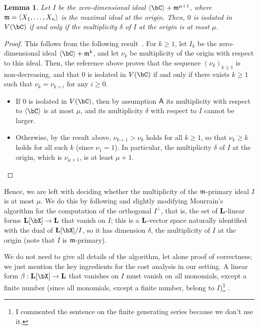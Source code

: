 \documentclass[12pt]{article}
\newtheorem{lemma}[definition]{Lemma}
\begin{document}
\begin{lemma}
  Let $I$ be the zero-dimensional ideal
  $\langle \bC \rangle + \m^{\mu+1}$, where
  $\mathfrak{m}=\langle X_1,\dots,X_n\rangle$ is the maximal ideal at the
  origin. Then, $0$ is isolated in $V(\bC)$ if and only if the
  multiplicity $\delta$ of $I$ at the origin is at most $\mu$.
\end{lemma}
\begin{proof}
  This follows from the following
  result~\cite[Theorem~A.1]{BaHaPeSo09}.  For $k \ge 1$, let $I_k$ be
  the zero-dimensional ideal $\langle \bC \rangle + \m^{k}$, and let
  $\nu_k$ be multiplicity of the origin with respect to this
  ideal. Then, the reference above proves that the sequence
  $(\nu_k)_{k \ge 1}$ is non-decreasing, and that $0$ is isolated in
  $V(\bC)$ if and only if there exists $k\ge 1$ such that
  $\nu_k=\nu_{k+i}$ for any $i\geq 0$.
  \begin{itemize}
  \item If $0$ is isolated in $V(\bC)$, then by assumption $\mathsf{A}$ 
    its multiplicity with respect to $\langle \bC\rangle$ is at most $\mu$,
    and its multiplicity $\delta$ with respect to $I$ cannot be larger.
  \item Otherwise, by the result above, $\nu_{k+1} > \nu_k$ holds for
    all $k \ge 1$, so that $\nu_k \ge k$ holds for all such $k$ (since
    $\nu_1=1$). In particular, the multiplicity $\delta$ of 
 $I$ at the origin, which is $\nu_{\mu+1}$, is at least $\mu+1$.
    \qedhere
  \end{itemize}
\end{proof}

Hence, we are left with deciding whether the multiplicity of the
$\mathfrak{m}$-primary ideal $I$ is at most $\mu$. We do this by following and
slightly modifying Mourrain's algorithm for the computation of the
orthogonal $I^{\perp}$, that is, the set of $\mathbf{L}$-linear forms
$\LL[\bX] \to \LL$ that vanish on $I$; this is a $\mathbf{L}$-vector space
naturally identified with the dual of $\LL[\bX]/I$, so it has dimension
$\delta$, the multiplicity of $I$ at the origin (note that $I$ is $\mathfrak{m}$-primary).

We do not need to give all details of the algorithm, let alone proof
of correctness; we just mention the key ingredients for the cost
analysis in our setting. A linear form $\beta: \LL[\bX] \to \LL$ that
vanishes on $I$ must vanish on all monomials, except a finite number
(since all monomials, except a finite number, belong to
$I$)\footnote{I commented the sentence on the finite generating series
  because we don't use it.}%
.
\end{document}

